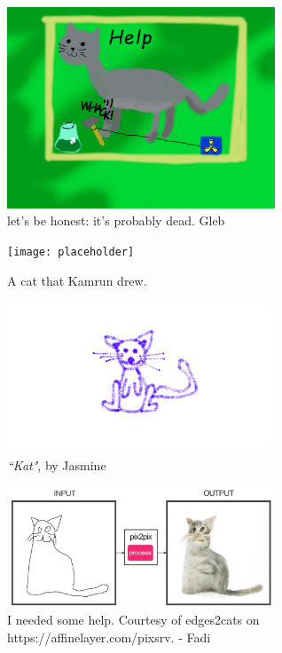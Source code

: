 \begin{centering}
\begin{figure}
	\includegraphics[width=8cm]{cat-gleb.pdf}
  \caption{let's be honest: it's probably dead. Gleb }
  \label{fig:cat_gleb}
\end{figure}



\begin{figure}
	\texttt{[image: placeholder]}
  \caption{A cat that Kamrun drew.}
  \label{Cat draw by Kamrun}
\end{figure}




\begin{figure} \centering
    \includegraphics[width=8cm]{kat.pdf}
    \caption{\emph{``Kat"}, by Jasmine}
    \label{kat}
\end{figure}


\begin{figure}\centering
  \includegraphics[width=8cm]{cat-fadiwassaf.pdf}
  \caption{I needed some help. Courtesy of edges2cats on https://affinelayer.com/pixsrv. - Fadi}
  \label{cat-fadi}
\end{figure}




\end{centering}

